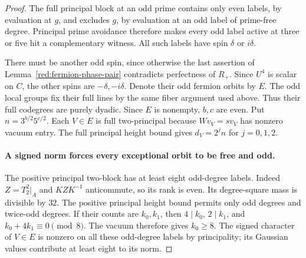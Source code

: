 \documentclass[11pt,a4paper]{article}
\numberwithin{equation}{section}
\begin{document}
\begin{proof}
The full principal block at an odd prime contains only even
labels, by evaluation at $g$, and excludes $g$, by evaluation at
an odd label of prime-free degree. Principal prime avoidance
therefore makes every odd label active at three or five hit a
complementary witness. All such labels have spin $\delta$ or
$i\delta$.

There must be another odd spin, since otherwise the last assertion
of Lemma~\ref{red:fermion-phase-pair} contradicts perfectness of
$R_+$. Since $U^4$ is scalar on $C$, the other spins are
$-\delta,-i\delta$. Denote their odd fermion orbits by $E$.
The odd local groups fix their full lines by the same fiber
argument used above. Thus their full codegrees are purely
dyadic. Since $E$ is nonempty, $b,c$ are even. Put
$n=3^{b/2}5^{c/2}$. Each $V\in E$ is full two-principal because
$Wv_V=sv_V$ has nonzero vacuum entry. The full principal height
bound gives $d_V=2^j n$ for $j=0,1,2$.

\paragraph{A signed norm forces every exceptional orbit to be free and odd.}
The positive principal two-block has at least eight odd-degree
labels. Indeed $Z=T_2^2|_A$ and $KZK^{-1}$ anticommute, so its
rank is even. Its degree-square mass is divisible by $32$.
The positive principal height bound permits only odd degrees and
twice-odd degrees. If their counts are $k_0,k_1$, then
$4\mid k_0$, $2\mid k_1$, and
$k_0+4k_1\equiv0\pmod8$. The vacuum therefore gives $k_0\ge8$.
The signed character of $V\in E$ is nonzero on all these
odd-degree labels by principality; its Gaussian values contribute
at least eight to its norm.


\end{proof}
\end{document}
